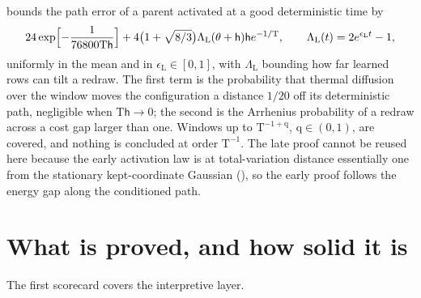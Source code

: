  bounds the path error of a parent activated at a good deterministic
time by
\[
24\exp\Bigl[-\frac1{76800\mathrm T\mathsf h}\Bigr]
+4\bigl(1+\sqrt{8/3}\bigr)\Lambda_{\mathrm L}(\theta+\mathsf h)\mathsf he^{-1/\mathrm T},
\qquad
\Lambda_{\mathrm L}(t)=2e^{\epsilon_{\mathrm L}t}-1,
\]
uniformly in the mean and in $\epsilon_{\mathrm L}\in[0,1]$, with $\Lambda_{\mathrm L}$ bounding how far
learned rows can tilt a redraw. The first term is the probability that thermal diffusion over the window
moves the configuration a distance $1/20$ off its deterministic path, negligible when
$\mathrm T\mathsf h\to0$; the second is the Arrhenius probability of a redraw across a cost gap larger than
one. Windows up to $\mathrm T^{-1+\mathrm q}$, $\mathrm q\in(0,1)$, are covered, and nothing is concluded
at order $\mathrm T^{-1}$. The late proof cannot be reused here because the early activation law is at
total-variation distance essentially one from the stationary kept-coordinate Gaussian
(), so the early proof follows the energy gap along the
conditioned path.

\section{What is proved, and how solid it is}
\label{comp:ch14-scorecard}

The first scorecard covers the interpretive layer.

